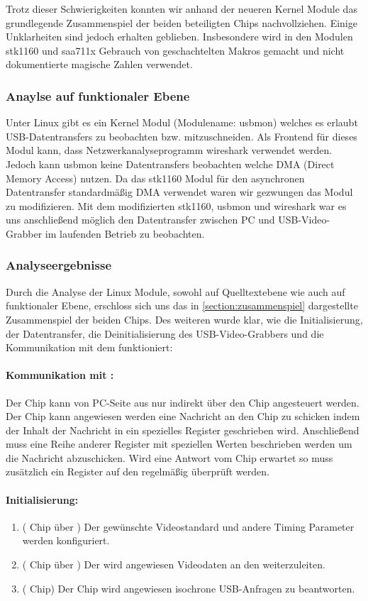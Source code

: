 Trotz dieser Schwierigkeiten konnten wir anhand der neueren Kernel Module das grundlegende Zusammenspiel der beiden beteiligten Chips nachvollziehen. Einige Unklarheiten sind jedoch erhalten geblieben. Insbesondere wird in den Modulen stk1160 und saa711x Gebrauch von geschachtelten Makros gemacht und nicht dokumentierte magische Zahlen verwendet. 

\subsubsection{Anaylse auf funktionaler Ebene}
Unter Linux gibt es ein Kernel Modul (Modulename: usbmon) welches es erlaubt USB-Datentransfers zu beobachten bzw. 
mitzuschneiden. Als Frontend für dieses Modul kann, dass Netzwerkanalyseprogramm wireshark verwendet werden. 
Jedoch kann usbmon keine Datentransfers beobachten welche DMA (Direct Memory Access) nutzen. Da das stk1160 Modul für den 
asynchronen Datentransfer standardmäßig DMA verwendet waren wir gezwungen das Modul zu modifizieren.
Mit dem modifizierten stk1160, usbmon und wireshark war es uns anschließend möglich den Datentransfer zwischen PC
und USB-Video-Grabber im laufenden Betrieb zu beobachten. 

\subsubsection{Analyseergebnisse}
Durch die Analyse der Linux Module, sowohl auf Quelltextebene wie auch auf funktionaler Ebene, erschloss sich uns das in \autoref{section:zusammenspiel} dargestellte Zusammenspiel der beiden Chips. Des weiteren wurde klar, wie die Initialisierung, der Datentransfer, die Deinitialisierung des
USB-Video-Grabbers und die Kommunikation mit dem \saa{} funktioniert:

\paragraph{Kommunikation mit \saa{}:} Der \saa{} Chip kann von PC-Seite aus nur indirekt über den \stk{} Chip angesteuert werden.
Der \stk{} Chip kann angewiesen werden eine \iic{} Nachricht an den \saa{} Chip zu schicken indem der Inhalt der Nachricht in ein
spezielles Register geschrieben wird. Anschließend muss eine Reihe anderer Register mit speziellen Werten beschrieben werden um
die Nachricht abzuschicken. Wird eine Antwort vom \saa{} Chip erwartet so muss zusätzlich ein Register auf den \stk{} regelmäßig überprüft werden.

\paragraph{Initialisierung:}
\begin{enumerate}
 \item (\saa{} Chip über \iic{}) Der gewünschte Videostandard und andere Timing Parameter werden konfiguriert.
 \item (\saa{} Chip über \iic{}) Der \saa{} wird angewiesen Videodaten an den \stk{} weiterzuleiten.
 \item (\stk{} Chip) Der Chip wird angewiesen isochrone USB-Anfragen zu beantworten.
\end{enumerate}

